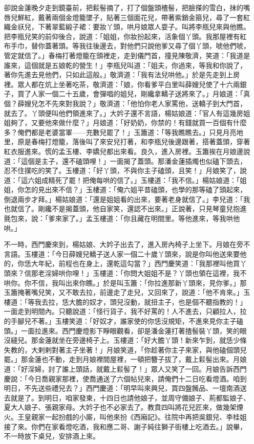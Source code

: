 卻說金蓮晚夕走到鏡臺前，把鬏髻摘了，打了個盤頭楂髻，把臉搽的雪白，抹的嘴唇兒鮮紅，戴著兩個金燈籠墜子，貼著三個面花兒，帶著紫銷金箍兒，尋了一套紅織金祆兒，下著翠藍緞子裙：要妝丫頭，哄月娘眾人耍子。叫將李瓶兒來與他瞧。把李瓶兒笑的前仰後合，說道：「姐姐，你妝扮起來，活象個丫頭。我那屋裡有紅布手巾，替你蓋著頭。等我往後邊去，對他們只說他爹又尋了個丫頭，唬他們唬，管定就信了。」春梅打著燈籠在頭裡走，走到儀門首，撞見陳敬濟，笑道：「我道是誰來，這個就是五娘乾的營生！」李瓶兒叫道：「姐夫，你過來，等我和你說了，著你先進去見他們，只如此這般。」敬濟道：「我有法兒哄他。」於是先走到上房裡。眾人都在炕上坐著吃茶，敬濟道：「娘，你看爹平白里叫薛嫂兒使了十六兩銀子，買了人家一個二十五歲，會彈唱的姐兒，剛纔拿轎子送將來了。」月娘道：「真個？薛嫂兒怎不先來對我說？」敬濟道：「他怕你老人家罵他，送轎子到大門首，就去了。丫頭便叫他們領進來了。」大妗子還不言語，楊姑娘道：「官人有這幾房姐姐夠了，又要他來做什麼？」月娘道：「好奶奶，你禁的！有錢就買一百個有什麼多？俺們都是老婆當軍——充數兒罷了！」玉簫道：「等我瞧瞧去。」只見月亮地里，原是春梅打燈籠，落後叫了來安兒打著，和李瓶兒後邊跟著，搭著蓋頭，穿著紅衣服進來。慌的孟玉樓、李嬌兒都出來看。良久，進入房裡。玉簫挨在月娘邊說道：「這個是主子，還不磕頭哩！」一面揭了蓋頭。那潘金蓮插燭也似磕下頭去，忍不住撲吃的笑了。玉樓道：「好丫頭，不與你主子磕頭，且笑！」月娘笑了，說道：「這六姐成精死了罷！把俺每哄的信了。」玉樓道：「我不信。」楊姑娘道：「姐姐，你怎的見出來不信？」玉樓道：「俺六姐平昔磕頭，也學的那等磕了頭起來，倒退兩步才拜。」楊姑娘道：「還是姐姐看的出來，要著老身就信了。」李兒道：「我也就信了。剛纔不是揭蓋頭，他自家笑，還認不出來。」正說著，只見琴童兒抱進氈包來，說：「爹來家了。」孟玉樓道：「你且藏在明間里。等他進來，等我哄他哄。」

不一時，西門慶來到，楊姑娘、大妗子出去了，進入房內椅子上坐下。月娘在旁不言語。玉樓道：「今日薛嫂兒轎子送人家一個二十歲丫頭來，說是你叫他送來要他的，你恁大年紀，前程也在身上，還乾這勾當？」西門慶笑道：「我那裡叫他買丫頭來？信那老淫婦哄你哩！」玉樓道：「你問大姐姐不是？丫頭也領在這裡，我不哄你。你不信，我叫出來你瞧。」於是叫玉簫：「你拉進那新丫頭來，見你爹。」那玉簫掩著嘴兒笑，又不敢去拉，前邊走了走兒，又回來了，說道：「他不肯來。」玉樓道：「等我去拉，恁大膽的奴才，頭兒沒動，就扭主子，也是個不聽指教的！」一面走到明間內。只聽說道：「怪行貨子，我不好罵的！人不進去，只顧拉人，拉的手腳兒不著。」玉樓笑道：「好奴才，誰家使的你恁沒規矩，不進來見你主子磕頭。」一面拉進來。西門慶燈影下睜眼觀看，卻是潘金蓮打著揸髻裝丫頭，笑的眼沒縫兒。那金蓮就坐在旁邊椅子上。玉樓道：「好大膽丫頭！新來乍到，就恁少條失教的，大剌剌對著主子坐著！」月娘笑道，「你趁著你主子來家，與他磕個頭兒罷。」那金蓮也不動，走到月娘裡間屋裡，一頓把簪子拔了，戴上鬏髻出來。月娘道：「好淫婦，討了誰上頭話，就戴上鬏髻了！」眾人又笑了一回。月娘告訴西門慶說：「今日喬親家那裡，使喬通送了六個帖兒來，請俺們十二日吃看燈酒。咱到明日，不先送些禮兒去？」西門慶道：「明早叫來興兒，買四盤餚品、一壇南酒送去就是了。到明日，咱家發柬，十四日也請他娘子，並周守備娘子、荊都監娘子、夏大人娘子、張親家母。大妗子也不必家去了。教賁四叫將花兒匠來，做幾架煙火。王皇親家一起扮戲的小廝，叫他來扮《西廂記》。往院中再把吳銀兒、李桂姐接了來。你們在家看燈吃酒，我和應二哥、謝子純往獅子街樓上吃酒去。」說畢，不一時放下桌兒，安排酒上來。


